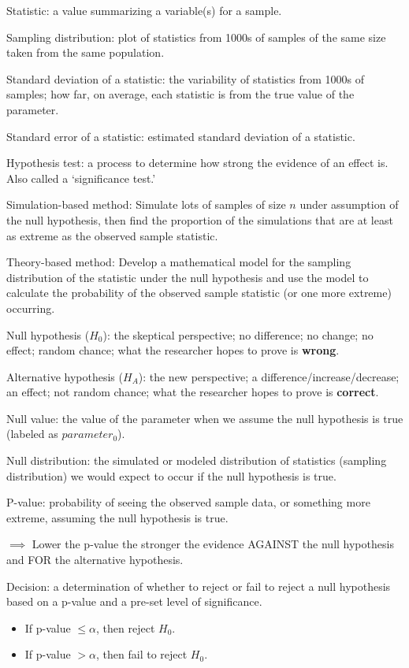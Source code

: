 \documentclass[
]{report}
\begin{document}
Statistic: a value summarizing a variable(s) for a sample.

Sampling distribution: plot of statistics from 1000s of samples of the same size taken from the same population.

Standard deviation of a statistic: the variability of statistics from 1000s of samples; how far, on average, each statistic is from the true value of the parameter.

Standard error of a statistic: estimated standard deviation of a statistic.

Hypothesis test: a process to determine how strong the evidence of an effect is. Also called a `significance test.'

Simulation-based method: Simulate lots of samples of size \(n\) under assumption of the null hypothesis, then find the proportion of the simulations that are at least as extreme as the observed sample statistic.

Theory-based method: Develop a mathematical model for the sampling distribution of the statistic under the null hypothesis and use the model to calculate the probability of the observed sample statistic (or one more extreme) occurring.

Null hypothesis (\(H_0\)): the skeptical perspective; no difference; no change; no effect; random chance; what the researcher hopes to prove is \textbf{wrong}.

Alternative hypothesis (\(H_A\)): the new perspective; a difference/increase/decrease; an effect; not random chance; what the researcher hopes to prove is \textbf{correct}.

Null value: the value of the parameter when we assume the null hypothesis is true (labeled as \(parameter_0\)).

Null distribution: the simulated or modeled distribution of statistics (sampling distribution) we would expect to occur if the null hypothesis is true.

P-value: probability of seeing the observed sample data, or something more extreme, assuming the null hypothesis is true.

\(\implies\) Lower the p-value the stronger the evidence AGAINST the null hypothesis and FOR the alternative hypothesis.

Decision: a determination of whether to reject or fail to reject a null hypothesis based on a p-value and a pre-set level of significance.

\begin{itemize}
\item
  If p-value \(\leq \alpha\), then reject \(H_0\).
\item
  If p-value \(> \alpha\), then fail to reject \(H_0\).
\end{itemize}
\end{document}

